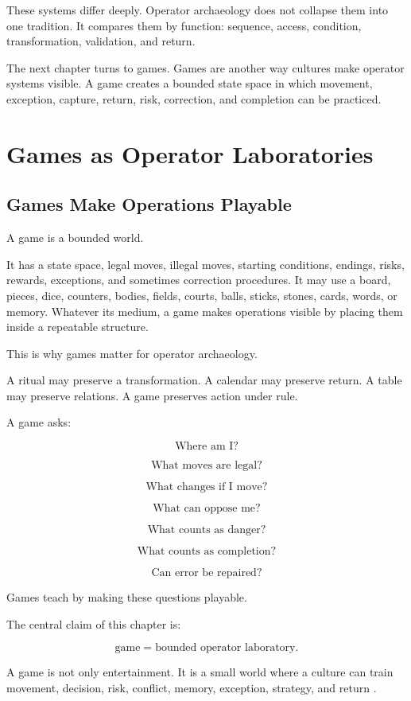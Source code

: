 \documentclass[11pt]{book}
\begin{document}
These systems differ deeply. Operator archaeology does not collapse them into one tradition. It compares them by function: sequence, access, condition, transformation, validation, and return.

The next chapter turns to games. Games are another way cultures make operator systems visible. A game creates a bounded state space in which movement, exception, capture, return, risk, correction, and completion can be practiced.

\chapter{Games as Operator Laboratories}

\section{Games Make Operations Playable}

A game is a bounded world.

It has a state space, legal moves, illegal moves, starting conditions, endings, risks, rewards, exceptions, and sometimes correction procedures. It may use a board, pieces, dice, counters, bodies, fields, courts, balls, sticks, stones, cards, words, or memory. Whatever its medium, a game makes operations visible by placing them inside a repeatable structure.

This is why games matter for operator archaeology.

A ritual may preserve a transformation. A calendar may preserve return. A table may preserve relations. A game preserves action under rule.

A game asks:

\[
\text{Where am I?}
\]

\[
\text{What moves are legal?}
\]

\[
\text{What changes if I move?}
\]

\[
\text{What can oppose me?}
\]

\[
\text{What counts as danger?}
\]

\[
\text{What counts as completion?}
\]

\[
\text{Can error be repaired?}
\]

Games teach by making these questions playable.

The central claim of this chapter is:

\[
\text{game} = \text{bounded operator laboratory}.
\]

A game is not only entertainment. It is a small world where a culture can train movement, decision, risk, conflict, memory, exception, strategy, and return \cite{Murray1952BoardGames,Bell1969BoardTableGames,Finkel2007AncientBoardGames}.
\end{document}

